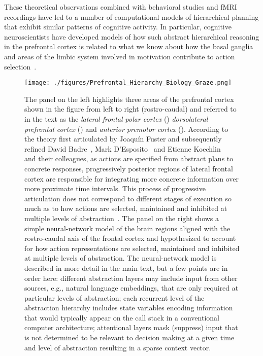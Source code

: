 These theoretical observations combined with behavioral studies and fMRI recordings have led to a number of computational models of hierarchical planning that exhibit similar patterns of cognitive activity. In particular, cognitive neuroscientists have developed models of how such abstract hierarchical reasoning in the prefrontal cortex is related to what we know about how the basal ganglia and areas of the limbic system involved in motivation contribute to action selection~\cite{OReillySCIENCE-06}. 


\begin{figure}
%
  \begin{center} 
    \texttt{[image: ./figures/Prefrontal\_Hierarchy\_Biology\_Graze.png]} 
  \end{center}
%
  \caption{%
%
    The panel on the left highlights three areas of the prefrontal cortex shown in the figure from left to right (rostro-caudal) and referred to in the text as the {\it{lateral frontal polar cortex}} () {\it{dorsolateral prefrontal cortex}} () and {\it{anterior premotor cortex}} (). According to the theory first articulated by Joaqu\'{i}n Fuster and subsequently refined David Badre~\cite{BadreandWagnerNEURON-04}, Mark D'Esposito~\cite{DEspositoetalNATURE-95} and Etienne Koechlin~\etal~\cite{KoechlinetalSCIENCE-03} and their colleagues, as actions are specified from abstract plans to concrete responses, progressively posterior regions of lateral frontal cortex are responsible for integrating more concrete information over more proximate time intervals. This process of progressive articulation does not correspond to different stages of execution so much as to how actions are selected, maintained and inhibited at multiple levels of abstraction~\cite{BadreTiCS-08}. The panel on the right shows a simple neural-network model of the brain regions aligned with the rostro-caudal axis of the frontal cortex and hypothesized to account for how action representations are selected, maintained and inhibited at multiple levels of abstraction. The neural-network model is described in more detail in the main text, but a few points are in order here: {} {\emdash{}} different abstraction layers may include input from other sources, e.g., natural language embeddings, that are only required at particular levels of abstraction; {} {\emdash{}} each recurrent level of the abstraction hierarchy includes state variables encoding information that would typically appear on the call stack in a conventional computer architecture; {} {\emdash{}} attentional layers mask (suppress) input that is not determined to be relevant to decision making at a given time and level of abstraction resulting in a sparse context vector.}
%
  \label{fig_prefer}
%
\end{figure}


